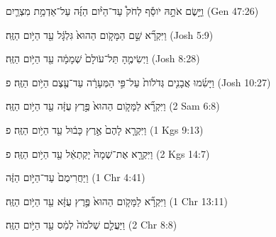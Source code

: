 
\begin{exe}

\ex\label{antdur_result_exs1}
\texthebrew{
וַיָּ֣שֶׂם אֹתָ֣הּ יֹוסֵ֡ף לְחֹק֩ עַד־הַיֹּ֨ום הַזֶּ֜ה עַל־אַדְמַ֥ת מִצְרַ֛יִם 
} (Gen 47:26)

\ex\label{antdur_result_exs2}
\texthebrew{
וַיִּקְרָ֞א שֵׁ֣ם הַמָּקֹ֤ום הַהוּא֙ גִּלְגָּ֔ל עַ֖ד הַיֹּ֥ום הַזֶּֽה׃ 
} (Josh 5:9)

\ex\label{antdur_result_exs3}
\texthebrew{
וַיְשִׂימֶ֤הָ תֵּל־עֹולָם֙ שְׁמָמָ֔ה עַ֖ד הַיֹּ֥ום הַזֶּֽה׃ 
} (Josh 8:28)

\ex\label{antdur_result_exs4}
\texthebrew{
וַיָּשִׂ֜מוּ אֲבָנִ֤ים גְּדֹלֹות֙ עַל־פִּ֣י הַמְּעָרָ֔ה עַד־עֶ֖צֶם הַיֹּ֥ום הַזֶּֽה׃ פ 
} (Josh 10:27)

\ex\label{antdur_result_exs5}
\texthebrew{
וַיִּקְרָ֞א לַמָּקֹ֤ום הַהוּא֙ פֶּ֣רֶץ עֻזָּ֔ה עַ֖ד הַיֹּ֥ום הַזֶּֽה׃ 
} (2 Sam 6:8)

\ex\label{antdur_result_exs6}
\texthebrew{
וַיִּקְרָ֤א לָהֶם֙ אֶ֣רֶץ כָּב֔וּל עַ֖ד הַיֹּ֥ום הַזֶּֽה׃ פ 
} (1 Kgs 9:13)

\ex\label{antdur_result_exs7}
\texthebrew{
וַיִּקְרָ֤א אֶת־שְׁמָהּ֙ יָקְתְאֵ֔ל עַ֖ד הַיֹּ֥ום הַזֶּֽה׃ פ 
} (2 Kgs 14:7)

\ex\label{antdur_result_exs8}
\texthebrew{
וַיַּחֲרִימֻם֙ עַד־הַיֹּ֣ום הַזֶּ֔ה 
} (1 Chr 4:41)

\ex\label{antdur_result_exs9}
\texthebrew{
וַיִּקְרָ֞א לַמָּקֹ֤ום הַהוּא֙ פֶּ֣רֶץ עֻזָּ֔א עַ֖ד הַיֹּ֥ום הַזֶּֽה׃ 
} (1 Chr 13:11)

\ex\label{antdur_result_exs10}
\texthebrew{
וַיַּעֲלֵ֤ם שְׁלֹמֹה֙ לְמַ֔ס עַ֖ד הַיֹּ֥ום הַזֶּֽה׃ 
} (2 Chr 8:8)

\end{exe}
